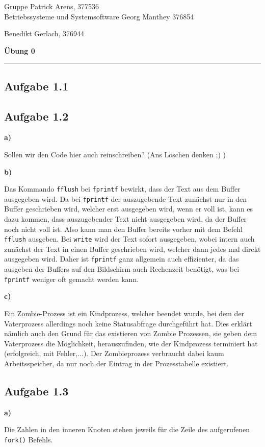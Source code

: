 \documentclass[a4paper,graphics,11pt]{article}
\newcommand{\aufgabe}[1]{\subsection*{Aufgabe #1}}
\begin{document}
    \noindent Gruppe              \hfill Patrick Arens, 377536\\
    \noindent Betriebssysteme und Systemsoftware    \hfill Georg Manthey 376854\\
    \strut\hfill Benedikt Gerlach, 376944\\
    \begin{center}
        \LARGE{\textbf{Übung 0}}
    \end{center}
    \begin{center}
    \rule[0.1ex]{\textwidth}{1pt}
    \end{center}
    
    \aufgabe{1.1}

    \aufgabe{1.2}

    \textbf{a)}

    Sollen wir den Code hier auch reinschreiben? (Ans Löschen denken ;) )

    

    \textbf{b)}

    Das Kommando \verb+fflush+ bei \verb+fprintf+ bewirkt, dass der Text aus dem Buffer ausgegeben wird. Da bei \verb+fprintf+ der auszugebende Text zunächst nur in den Buffer geschrieben wird, welcher erst ausgegeben wird, wenn er voll ist, kann es dazu kommen, dass auszugebender Text nicht ausgegeben wird, da der Buffer noch nicht voll ist. Also kann man den Buffer bereits vorher mit dem Befehl \verb+fflush+ ausgeben. Bei \verb+write+ wird der Text sofort ausgegeben, wobei intern auch zunächst der Text in einen Buffer geschrieben wird, welcher dann jedes mal direkt ausgegeben wird. Daher ist \verb+fprintf+ ganz allgemein auch effizienter, da das ausgeben der Buffers auf den Bildschirm auch Rechenzeit benötigt, was bei \verb+fprintf+ weniger oft gemacht werden kann.

    \textbf{c)}

    Ein Zombie-Prozess ist ein Kindprozess, welcher beendet wurde, bei dem der Vaterprozess allerdings noch keine Statusabfrage durchgeführt hat. Dies erklärt nämlich auch den Grund für das existieren von Zombie Prozessen, sie geben dem Vaterprozess die Möglichkeit, herauszufinden, wie der Kindprozess terminiert hat (erfolgreich, mit Fehler,...). Der Zombieprozess verbraucht dabei kaum Arbeitsspeicher, da nur noch der Eintrag in der Prozesstabelle existiert.

    \aufgabe{1.3}

    \textbf{a)}

    Die Zahlen in den inneren Knoten stehen jeweils für die Zeile des aufgerufenen \verb+fork()+ Befehls.
\end{document}
